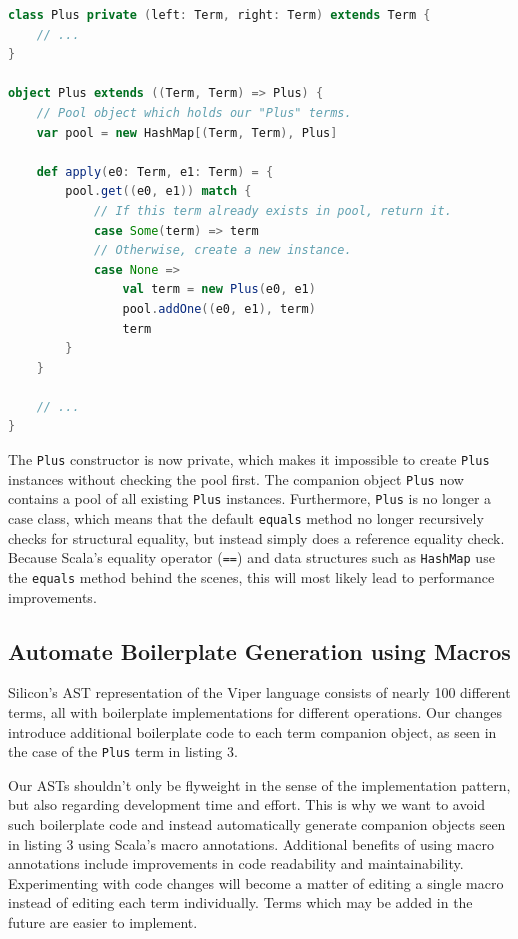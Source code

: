\documentclass[11pt]{article}
\begin{document}
    \begin{lstlisting}[language=Scala, caption=Avoid instantiating multiple structurally equal terms using the flyweight pattern.]
class Plus private (left: Term, right: Term) extends Term {
    // ...
}

object Plus extends ((Term, Term) => Plus) {
    // Pool object which holds our "Plus" terms.
    var pool = new HashMap[(Term, Term), Plus]

    def apply(e0: Term, e1: Term) = {
        pool.get((e0, e1)) match {
            // If this term already exists in pool, return it. 
            case Some(term) => term
            // Otherwise, create a new instance.
            case None =>
                val term = new Plus(e0, e1)
                pool.addOne((e0, e1), term)
                term
        }
    }

    // ...
}
    \end{lstlisting}

    The \texttt{Plus} constructor is now private, which makes it impossible to
    create \texttt{Plus} instances without checking the pool first. The companion
    object \texttt{Plus} now contains a pool of all existing \texttt{Plus} instances. Furthermore,
    \texttt{Plus} is no longer a case class, which means that the default \texttt{equals}
    method no longer recursively checks for structural equality, but instead
    simply does a reference equality check. Because Scala's equality operator (\texttt{==})
    and data structures such as \texttt{HashMap} use the \texttt{equals} method behind
    the scenes, this will most likely lead to performance improvements.

    \subsection{Automate Boilerplate Generation using Macros} \label{approach:macros}

    Silicon's AST representation of the Viper language consists of nearly 100 different terms,
    all with boilerplate implementations for different operations.
    Our changes introduce additional boilerplate code to each term companion object, as seen in the case
    of the \texttt{Plus} term in listing 3.

    Our ASTs shouldn't only be flyweight in the sense of the implementation pattern, but also
    regarding development time and effort. This is why we want to avoid such boilerplate
    code and instead automatically generate companion objects seen in listing 3 using Scala's macro annotations.
    Additional benefits of using macro annotations include improvements in code
    readability and maintainability. Experimenting with code changes will become a matter
    of editing a single macro instead of editing each term individually.
    Terms which may be added in the future are easier to implement.
\end{document}
